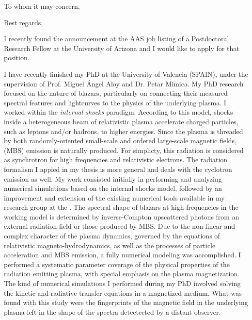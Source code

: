 
\date{\today}
\opening{To whom it may concern,}
\closing{Best regards,}
%
\makeletterhead%

I recently found the announcement at the AAS job listing of a Postdoctoral
Research Fellow at the University of Arizona and I would like to apply for that
position.

I have recently finished my PhD at the University of Valencia (SPAIN), under the
supervision of Prof. Miguel \'{A}ngel Aloy and Dr. Petar Mimica. My PhD research
focused on the nature of blazars, particularly on connecting their measured
spectral features and lightcurves to the physics of the underlying plasma. I
worked within the \emph{internal shocks} paradigm. According to this model,
shocks inside a heterogeneous beam of relativistic plasma accelerate charged
particles, such as leptons and/or hadrons, to higher energies. Since the plasma
is threaded by both randomly-oriented small-scale and ordered large-scale
magnetic fields, \mbs (MBS) emission is naturally produced. For simplicty, this
radiation is considered as synchrotron for high frequencies and relativistic
electrons. The radiation formalism I appied in my thesis is more general and
deals with the cyclotron emission as well. My work consisted initially in
performing and analyzing numerical simulations based on the internal shocks
model, followed by an improvement and extension of the existing numerical tools
available in my research group at the \UVval. The spectral shape of blazars at
high frequencies in the working model is determined by inverse-Compton
upscattered photons from an external radiation field or those produced by MBS.
Due to the non-linear and complex character of the plasma dynamics, governed by
the equations of relativistic magneto-hydrodynamics, as well as the processes of
particle acceleration and MBS emission, a fully numerical modeling was
accomplished. I performed a systematic parameter coverage of the physical
properties of the radiation emitting plasma, with special emphasis on the plasma
magnetization. The kind of numerical simulations I performed during my PhD
involved solving the kinetic and radiative transfer equations in a magnetized
medium. What was found with this study were the fingerprints of the magnetic
field in the underlying plasma left in the shape of the spectra detectected by a
distant observer.

